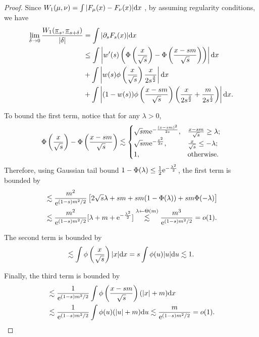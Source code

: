 \begin{proof}
Since $W_1(\mu,\nu)=\int|F_\mu(x)-F_\nu(x)|\mathrm{d} x$ \cite[Thm. 2.18]{villani2021topics}, by assuming regularity conditions, we have 
\begin{align*}
    \lim_{\delta\to0}\frac{W_1(\underline{\pi}_s,\underline{\pi}_{s+\delta})}{|\delta|}&=\int|\partial_sF_s(x)|\mathrm{d} x\\
    &\le\int\left|w'(s)\left(\Phi\left(\frac{x}{\sqrt{s}}\right)-\Phi\left(\frac{x-sm}{\sqrt{s}}\right)\right)\right|\mathrm{d} x\\
    &+\int \left|w(s)\phi\left(\frac{x}{\sqrt{s}}\right)\frac{x}{2s^{\frac32}}\right|\mathrm{d} x\\
    &+\int\left|(1-w(s))\phi\left(\frac{x-sm}{\sqrt{s}}\right)\left(\frac{x}{2s^{\frac32}}+\frac{m}{2s^{\frac12}}\right)\right|\mathrm{d} x.  
\end{align*}

To bound the first term, notice that for any $\lambda>0$,
\begin{equation*}
    \Phi\left(\frac{x}{\sqrt{s}}\right)-\Phi\left(\frac{x-sm}{\sqrt{s}}\right)\lesssim\begin{cases}
        \sqrt{s}m\mathrm{e}^{-\frac{(x-sm)^2}{2s}},&\frac{x-sm}{\sqrt{s}}\ge\lambda;\\
        \sqrt{s}m\mathrm{e}^{-\frac{x^2}{2s}},&\frac{x}{\sqrt{s}}\le-\lambda;\\
        1,&\text{otherwise}.
    \end{cases}
\end{equation*}
Therefore, using Gaussian tail bound $1-\Phi(\lambda)\le\frac{1}{2}\mathrm{e}^{-\frac{\lambda^2}{2}}$, the first term is bounded by
\begin{align*}
    &\lesssim\frac{m^2}{\mathrm{e}^{(1-s)m^2/2}}\left[2\sqrt{s}\lambda+sm+sm(1-\Phi(\lambda))+sm\Phi(-\lambda)\right]\\
    &\lesssim\frac{m^2}{\mathrm{e}^{(1-s)m^2/2}}[\lambda+m+\mathrm{e}^{-\frac{\lambda^2}{2}}]\stackrel{\lambda\gets \Theta(m)}{\lesssim}\frac{m^3}{\mathrm{e}^{(1-s)m^2/2}}=o(1).
\end{align*}

The second term is bounded by
\begin{align*}
    \lesssim\int\phi\left(\frac{x}{\sqrt{s}}\right)|x|\mathrm{d} x=s\int\phi(u)|u|\mathrm{d} u\lesssim1.
\end{align*}

Finally, the third term is bounded by
\begin{align*}
    &\lesssim\frac{1}{\mathrm{e}^{(1-s)m^2/2}}\int\phi\left(\frac{x-sm}{\sqrt{s}}\right)(|x|+m)\mathrm{d} x\\
    &\lesssim\frac{1}{\mathrm{e}^{(1-s)m^2/2}}\int\phi(u)(|u|+m)\mathrm{d} u\lesssim\frac{m}{\mathrm{e}^{(1-s)m^2/2}}=o(1).
\end{align*}
\end{proof}